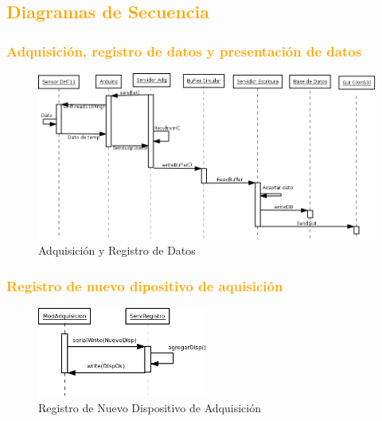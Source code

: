 \newpage
\subsection{\textcolor{orange}{Diagramas de Secuencia}}
\subsubsection{\textcolor{orange}{Adquisición, registro de datos y presentación de datos}}
\begin{figure}[h!]
 \begin{center}
  \includegraphics[width=1\textwidth,keepaspectratio=true]{img/Diagrama_secuencia.png}
  \caption{Adquisición y Registro de Datos}
  \label{fig:esquema}
 \end{center}
\end{figure}
\subsubsection{\textcolor{orange}{Registro de nuevo dipositivo de aquisición}}
\begin{figure}[h!]
 \begin{center}
  \includegraphics[width=0.5\textwidth,keepaspectratio=true]{img/agregardisp.png}
  \caption{Registro de Nuevo Dispositivo de Adquisición}
  \label{fig:esquema}
 \end{center}
\end{figure}

\newpage
